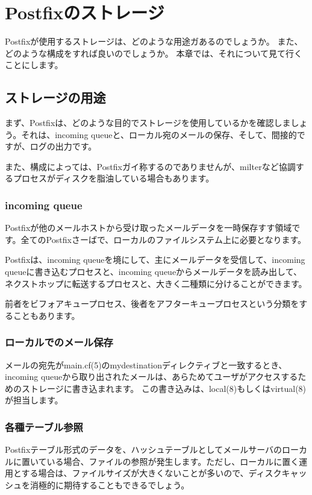 \chapter{Postfixのストレージ}

Postfixが使用するストレージは、どのような用途ガあるのでしょうか。
また、どのような構成をすれば良いのでしょうか。
本章では、それについて見て行くことにします。

\section{ストレージの用途}

まず、Postfixは、どのような目的でストレージを使用しているかを確認しましょう。それは、incoming queueと、ローカル宛のメールの保存、そして、間接的ですが、ログの出力です。

また、構成によっては、Postfixガイ称するのでありませんが、milterなど協調するプロセスがディスクを脂油している場合もあります。

\subsection{incoming queue}

Postfixが他のメールホストから受け取ったメールデータを一時保存すす領域です。全てのPostfixさーばで、ローカルのファイルシステム上に必要となります。

Postfixは、incoming queueを境にして、主にメールデータを受信して、incoming queueに書き込むプロセスと、incoming queueからメールデータを読み出して、ネクストホップに転送するプロセスと、大きく二種類に分けることができます。

前者をビフォアキュープロセス、後者をアフターキュープロセスという分類をすることもあります。

\subsection{ローカルでのメール保存}

メールの宛先がmain.cf(5)のmydestinationディレクティブと一致するとき、incoming queueから取り出されたメールは、あらためてユーザがアクセスするためのストレージに書き込まれます。
この書き込みは、local(8)もしくはvirtual(8)が担当します。

\subsection{各種テーブル参照}

Postfixテーブル形式のデータを、ハッシュテーブルとしてメールサーバのローカルに置いている場合、ファイルの参照が発生します。ただし、ローカルに置く運用とする場合は、ファイルサイズが大きくないことが多いので、ディスクキャッシュを消極的に期待することもできるでしょう。

